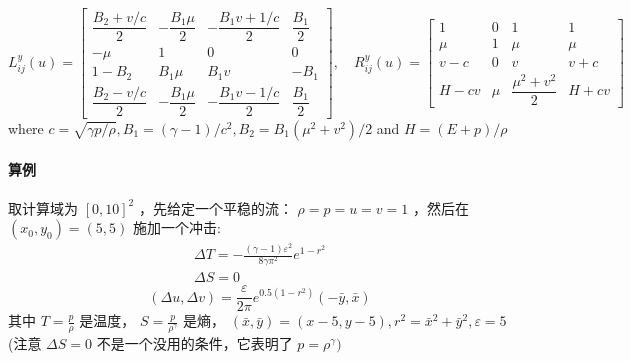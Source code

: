 \documentclass{book}
\begin{document}
\begin{equation}
  L_{i j}^{y}(u)=\begin{bmatrix}
    \dfrac{B_{2}+v / c}{2} & -\dfrac{B_{1} \mu}{2} & -\dfrac{B_{1} v+1 / c}{2} & \dfrac{B_{1}}{2} \\
    -\mu                   & 1                     & 0                         & 0                \\
    1-B_{2}                & B_{1} \mu             & B_{1} v                   & -B_{1}           \\
    \dfrac{B_{2}-v / c}{2} & -\dfrac{B_{1} \mu}{2} & -\dfrac{B_{1} v-1 / c}{2} & \dfrac{B_{1}}{2}
  \end{bmatrix},\quad
  R_{i j}^{y}(u)=\begin{bmatrix}
    1     & 0   & 1                        & 1     \\
    \mu   & 1   & \mu                      & \mu   \\
    v-c   & 0   & v                        & v+c   \\
    H-c v & \mu & \dfrac{\mu^{2}+v^{2}}{2} & H+c v
  \end{bmatrix}
\end{equation}
where  $c=\sqrt{\gamma p / \rho}, B_{1}=(\gamma-1) / c^{2}, B_{2}=B_{1}\left(\mu^{2}+v^{2}\right) / 2$  and  $H=(E+p) / \rho$
\paragraph{算例}

\begin{example}[光滑算例]
  取计算域为  $[0,10]^{2}$  ，先给定一个平稳的流： $\rho=p=u=v=1$  ，然后在  $\left(x_{0}, y_{0}\right)=(5,5)$  施加一个冲击:
  \begin{equation}
    \begin{array}{l}
      \Delta T=-\frac{(\gamma-1) \varepsilon^{2}}{8 \gamma \pi^{2}} e^{1-r^{2}} \\
      \Delta S=0
    \end{array}
  \end{equation}
  \begin{equation}
    (\Delta u, \Delta v)=\frac{\varepsilon}{2 \pi} e^{0.5\left(1-r^{2}\right)}(-\bar{y}, \bar{x})
  \end{equation}
  其中  $T=\frac{p}{\rho}$  是温度，  $S=\frac{p}{\rho^{\gamma}}$  是熵，  $(\bar{x}, \bar{y})=(x-5, y-5) , r^{2}=\bar{x}^{2}+\bar{y}^{2}, \varepsilon=5 $
  (注意 $\Delta S=0$ 不是一个没用的条件，它表明了 $ p=\rho^{\gamma}  )$
\end{example}
\end{document}
